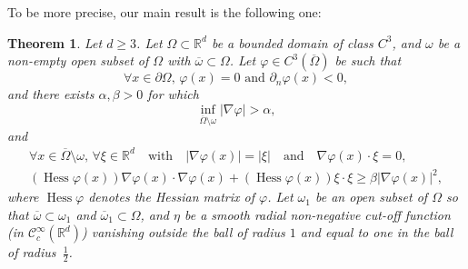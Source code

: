 \documentclass[10pt]{amsart}
\newtheorem{theo}{Theorem}[section]
\theoremstyle{definition}\newtheorem{defi}[theo]{Definition}\newtheorem{rema}[theo]{Remark}\newtheorem{exam}[theo]{Example}\newtheorem{exem}[theo]{Example}\newtheorem{nota}[theo]{Notation}
\newcommand{\scC}{\mathscr{C}}
\newcommand*\R{\mathbb{R}}
\renewcommand{\geq}{\geqslant}
\DeclareMathOperator{\Hess}{Hess}
\let\oldforall\forall
\renewcommand*{\forall}{\mathrel{\oldforall}}
\begin{document}
To be more precise, our main result is the following one:
\begin{theo}\label{Thm-Carleman-General}
Let $d\geqslant 3$. Let $\Omega \subset \R^{d}$ be a bounded domain of class $C^3$, and $\omega$ be a non-empty open subset of $\Omega$ with $\overline \omega \subset \Omega$. Let $\varphi \in C^3(\overline{\Omega})$ be such that
\begin{equation}\label{CarlemanWeight-Cond0}
\forall x \in \partial \Omega, \, \varphi(x) = 0 \text{ and }
\partial_n \varphi(x) < 0,
\end{equation}
and there exists $\alpha, \beta > 0$ for which
\begin{equation}\label{CarlemanWeight-Cond1}
\inf_{\overline{\Omega}\setminus \omega} \vert \nabla \varphi \vert > \alpha,
\end{equation}
and
\begin{multline}\label{CarlemanWeight-Cond2}
\forall x \in \overline{\Omega} \setminus \omega, \, \forall \xi \in \R^d \quad\text{with}\quad \vert \nabla \varphi(x) \vert = \vert \xi \vert \quad\text{and}\quad \nabla \varphi(x) \cdot \xi = 0,
\\
(\Hess \varphi(x)) \nabla \varphi(x) \cdot \nabla \varphi(x) + (\Hess \varphi(x)) \xi \cdot \xi \geq \beta \vert \nabla \varphi(x) \vert^2,
\end{multline}
where $\Hess \varphi$ denotes the Hessian matrix of $\varphi$. Let $\omega_1$ be an open subset of $\Omega$ so that $\overline \omega \subset \omega_1$ and $\overline\omega_1 \subset \Omega$, and $\eta$ be a smooth radial non-negative cut-off function (in $\scC^\infty_c(\R^d)$) vanishing outside the ball of radius $1$ and equal to one in the ball of radius~$\frac{1}{2}$.


\end{theo}
\end{document}

